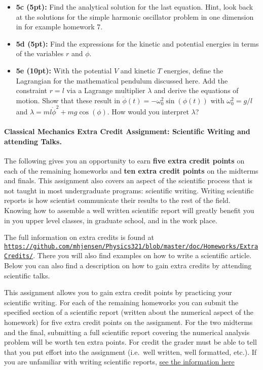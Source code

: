 \documentclass[%
oneside,                 %
final,                   %
10pt]{article}
\begin{document}
\begin{itemize}
\item \textbf{5c (5pt):} Find the analytical solution for the last equation. Hint, look back at the solutions for the simple harmonic oscillator problem in one dimension in for example homework 7.

\item \textbf{5d (5pt):} Find the expressions for the kinetic and potential energies in terms of the variables $r$ and $\phi$. 

\item \textbf{5e (10pt):} With the potential $V$  and kinetic $T$ energies, define the Lagrangian for the mathematical pendulum discussed here. Add the constraint $r=l$ via a Lagrange multiplier $\lambda$ and derive the equations of motion. Show that these result in  $\ddot{\phi}(t)=-\omega_0^2\sin{(\phi(t))}$ with $\omega_0^2=g/l$ and $\lambda=ml\dot{\phi}^2+mg\cos{(\phi)}$.  How would you interpret $\lambda$? 
\end{itemize}

\noindent
\paragraph{Classical Mechanics Extra Credit Assignment: Scientific Writing and attending Talks.}
The following gives you an opportunity to earn \textbf{five extra credit
points} on each of the remaining homeworks and \textbf{ten extra credit points}
on the midterms and finals.  This assignment also covers an aspect of
the scientific process that is not taught in most undergraduate
programs: scientific writing.  Writing scientific reports is how
scientist communicate their results to the rest of the field.  Knowing
how to assemble a well written scientific report will greatly benefit
you in you upper level classes, in graduate school, and in the work
place.

The full information on extra credits is found at \href{{https://github.com/mhjensen/Physics321/blob/master/doc/Homeworks/ExtraCredits/}}{\nolinkurl{https://github.com/mhjensen/Physics321/blob/master/doc/Homeworks/ExtraCredits/}}. There you will also find examples on how to write a scientific article. 
Below you can also find a description on how to gain extra credits by attending scientific talks.


This assignment allows you to gain extra credit points by practicing
your scientific writing.  For each of the remaining homeworks you can
submit the specified section of a scientific report (written about the
numerical aspect of the homework) for five extra credit points on the
assignment.  For the two midterms and the final, submitting a full
scientific report covering the numerical analysis problem will be
worth ten extra points.  For credit the grader must be able to tell
that you put effort into the assignment (i.e.~well written, well
formatted, etc.).  If you are unfamiliar with writing scientific
reports, \href{{https://github.com/mhjensen/Physics321/blob/master/doc/Homeworks/ExtraCredits/IntroductionScientificWriting.md}}{see the information here}
\end{document}
